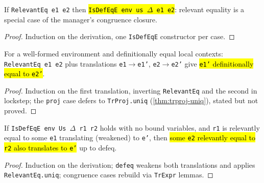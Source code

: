 \begin{theorem}
\label{thm:eqvmgr-isdefeqe-relevant}
\leanok
{}
 If \texttt{RelevantEq e1 e2} then \hl{\texttt{IsDefEqE env us $\Delta$ e1 e2}}: relevant
equality is a special case of the manager's congruence closure.
\end{theorem}
\begin{proof}
\leanok
{} Induction on the derivation, one \texttt{IsDefEqE} constructor per case.
\end{proof}

\begin{theorem}
\label{thm:eqvmgr-relevanteq-uniq}
\leanok
{}
 For a well-formed environment and definitionally equal local contexts:
\texttt{RelevantEq e1 e2} plus translations \texttt{e1}$\to$\texttt{e1'}, \texttt{e2}$\to$\texttt{e2'}
give \hl{\texttt{e1'} definitionally equal to \texttt{e2'}}.
\end{theorem}
\begin{proof}
\leanok
{} Induction on the first translation, inverting \texttt{RelevantEq} and the second in
lockstep; the \texttt{proj} case defers to \texttt{TrProj.uniq} (\ref{thm:trproj-uniq}), stated but
not proved.
\end{proof}

\begin{theorem}
\label{thm:eqvmgr-isdefeqe-trexpr}
\leanok
{}
 If \texttt{IsDefEqE env Us $\Delta$ r1 r2} holds with no bound variables, and
\texttt{r1} is relevantly equal to some \texttt{e1} translating (weakened) to \texttt{e'}, then
\hl{some \texttt{e2} relevantly equal to \texttt{r2} also translates to \texttt{e'}} up to defeq.
\end{theorem}
\begin{proof}
\leanok
{} Induction on the derivation; \texttt{defeq} weakens both translations and applies
\texttt{RelevantEq.uniq}; congruence cases rebuild via \texttt{TrExpr} lemmas.
\end{proof}

